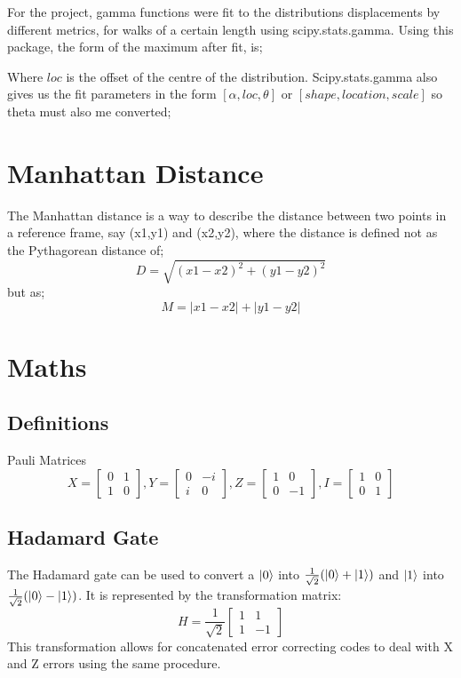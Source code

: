 For the project, gamma functions were fit to the distributions displacements by different metrics, for walks of a certain length using scipy.stats.gamma. Using this package, the form of the maximum after fit, is;

Where $loc$ is the offset of the centre of the distribution.
Scipy.stats.gamma also gives us the fit parameters in the form $[\alpha, loc, \theta ]$ or $[shape, location, scale]$ so theta must also me converted;
\begin{figure}

\end{figure}
\section{Manhattan Distance}
	The Manhattan distance is a way to describe the distance between two points in a reference frame, say (x1,y1) and (x2,y2), where the distance is defined not as the Pythagorean distance of; 
	$$D = \sqrt{(x1-x2)^2 + (y1-y2)^2}$$ 
	but as; 
	$$M = |x1-x2|+|y1-y2|$$ 


\section{Maths}
		\subsection{Definitions}
		\label{app:pauli}
		Pauli Matrices
		\[
		X = 
		\begin{bmatrix}
		0 & 1 \\
		1 & 0
		\end{bmatrix}
		, Y = 
		\begin{bmatrix}
		0  & -i \\
		i & 0
		\end{bmatrix}
		, Z = 
		\begin{bmatrix}
		1  & 0 \\
		0 & -1
		\end{bmatrix}
		, I = 
		\begin{bmatrix}
		1  & 0 \\
		0 & 1
		\end{bmatrix}
		\label{fig:pauli}
		\]
\subsection{Hadamard Gate}
\label{app:hadamard}
		The Hadamard gate can be used to convert a $\ket{0}$ into $ \frac{1}{\sqrt{2}}(\ket{0} +\ket{1})$ and $\ket{1}$ into $ \frac{1}{\sqrt{2}}(\ket{0} -\ket{1})$.
		It is represented by the transformation matrix:
		\[ H = 
				\frac{1}{\sqrt{2}}\begin{bmatrix}
				1  & 1 \\
				1 & -1
				\end{bmatrix}
				\]
		This transformation allows for concatenated error correcting codes to deal with X and Z errors using the same procedure. 
